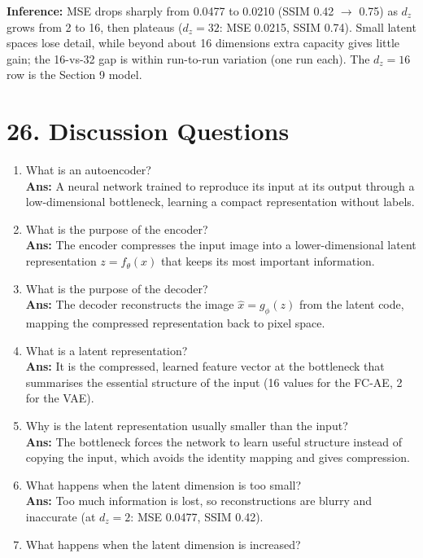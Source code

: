 \documentclass[10pt]{article}
\begin{document}
\textbf{Inference:} MSE drops sharply from 0.0477 to 0.0210 (SSIM 0.42 $\to$ 0.75) as $d_z$ grows from 2 to 16, then plateaus ($d_z=32$: MSE 0.0215, SSIM 0.74). Small latent spaces lose detail, while beyond about 16 dimensions extra capacity gives little gain; the 16-vs-32 gap is within run-to-run variation (one run each). The $d_z=16$ row is the Section 9 model.

\section*{26. Discussion Questions}

\begin{enumerate}
\item What is an autoencoder?\\
\textbf{Ans:} A neural network trained to reproduce its input at its output through a low-dimensional bottleneck, learning a compact representation without labels.
\item What is the purpose of the encoder?\\
\textbf{Ans:} The encoder compresses the input image into a lower-dimensional latent representation $z=f_\theta(x)$ that keeps its most important information.
\item What is the purpose of the decoder?\\
\textbf{Ans:} The decoder reconstructs the image $\hat{x}=g_\phi(z)$ from the latent code, mapping the compressed representation back to pixel space.
\item What is a latent representation?\\
\textbf{Ans:} It is the compressed, learned feature vector at the bottleneck that summarises the essential structure of the input (16 values for the FC-AE, 2 for the VAE).
\item Why is the latent representation usually smaller than the input?\\
\textbf{Ans:} The bottleneck forces the network to learn useful structure instead of copying the input, which avoids the identity mapping and gives compression.
\item What happens when the latent dimension is too small?\\
\textbf{Ans:} Too much information is lost, so reconstructions are blurry and inaccurate (at $d_z=2$: MSE 0.0477, SSIM 0.42).
\item What happens when the latent dimension is increased?\\

\end{enumerate}
\end{document}

